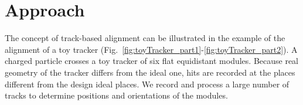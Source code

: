 \section{Approach}
\label{sec:alignmentAlg}


The concept of track-based alignment can be illustrated in the example of the alignment of a toy tracker (Fig.~\ref{fig:toyTracker_part1}-\ref{fig:toyTracker_part2}). A charged particle crosses a toy tracker of six flat equidistant modules. Because real geometry of the tracker differs from the ideal one, hits are recorded at the places different from the design ideal places. We record and process a large number of tracks to determine positions and orientations of the modules.


